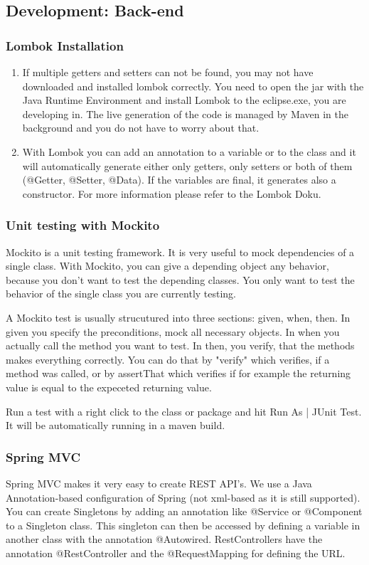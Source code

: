 \subsection{Development: Back-end}

\subsubsection{Lombok Installation}
\label{dev:lombok}
\begin{enumerate}
	\item If multiple getters and setters can not be found, you may not have downloaded and installed lombok correctly. You need to open the jar with the Java Runtime Environment and install Lombok to the eclipse.exe, you are developing in. The live generation of the code is managed by Maven in the background and you do not have to worry about that.
	\item With Lombok you can add an annotation to a variable or to the class and it will automatically generate either only getters, only setters or both of them (@Getter, @Setter, @Data). If the variables are final, it generates also a constructor. For more information please refer to the Lombok Doku.
\end{enumerate}

\subsubsection{Unit testing with Mockito}
Mockito is a unit testing framework. It is very useful to mock dependencies of a single class. With Mockito, you can give a depending object any behavior, because you don’t want to test the depending classes. You only want to test the behavior of the single class you are currently testing.\par
A Mockito test is usually strucutured into three sections: given, when, then. In given you specify the preconditions, mock all necessary objects. In when you actually call the method you want to test. In then, you verify, that the methods makes everything correctly. You can do that by "verify" which verifies, if a method was called, or by assertThat which verifies if for example the returning value is equal to the expeceted returning value.\par
Run a test with a right click to the class or package and hit Run As | JUnit Test. It will be automatically running in a maven build.

\subsubsection{Spring MVC}
Spring MVC makes it very easy to create REST API’s. We use a Java Annotation-based configuration of Spring (not xml-based as it is still supported). You can create Singletons by adding an annotation like @Service or @Component to a Singleton class. This singleton can then be accessed by defining a variable in another class with the annotation @Autowired. RestControllers have the annotation @RestController and the @RequestMapping for defining the URL.

